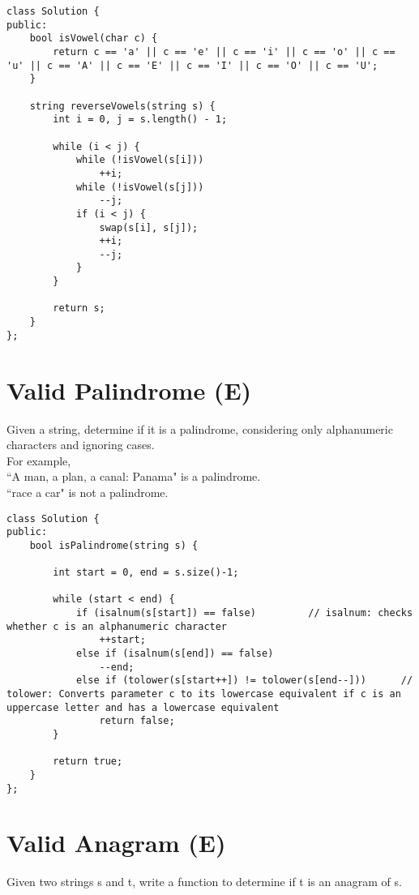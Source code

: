 \begin{lstlisting}
class Solution {
public:
    bool isVowel(char c) {
        return c == 'a' || c == 'e' || c == 'i' || c == 'o' || c == 'u' || c == 'A' || c == 'E' || c == 'I' || c == 'O' || c == 'U';
    }
    
    string reverseVowels(string s) {
        int i = 0, j = s.length() - 1;
        
        while (i < j) {
            while (!isVowel(s[i]))
                ++i;
            while (!isVowel(s[j]))
                --j;
            if (i < j) {
                swap(s[i], s[j]);
                ++i;
                --j;
            }
        }
        
        return s;
    }
};
\end{lstlisting}


\section{Valid Palindrome (E)}
Given a string, determine if it is a palindrome, considering only alphanumeric characters and ignoring cases. \\

For example,\\
``A man, a plan, a canal: Panama" is a palindrome.\\
``race a car" is not a palindrome. \\

\begin{lstlisting}
class Solution {
public:
    bool isPalindrome(string s) {
        
        int start = 0, end = s.size()-1;
        
        while (start < end) {
            if (isalnum(s[start]) == false)         // isalnum: checks whether c is an alphanumeric character
                ++start;
            else if (isalnum(s[end]) == false)
                --end;        
            else if (tolower(s[start++]) != tolower(s[end--]))      // tolower: Converts parameter c to its lowercase equivalent if c is an uppercase letter and has a lowercase equivalent
                return false;
        }
        
        return true;
    }
};
\end{lstlisting}


\section{Valid Anagram (E)}
Given two strings s and t, write a function to determine if t is an anagram of s.\\

